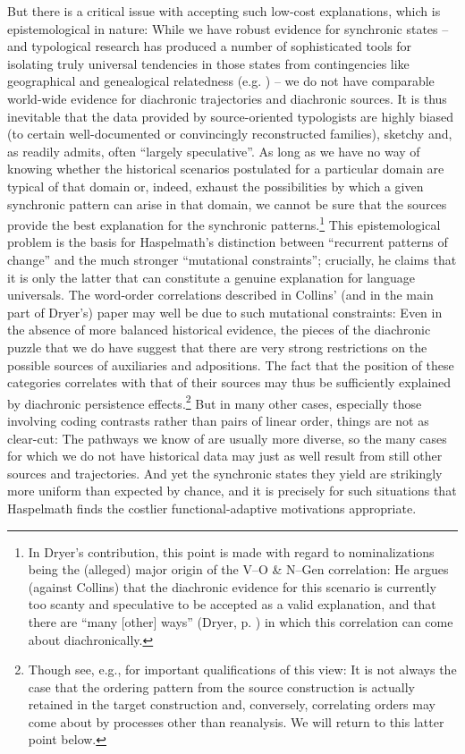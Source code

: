 \documentclass[output=paper]{langsci/langscibook}
\begin{document}
But there is a critical issue with accepting such low-cost explanations, which is epistemological in nature: While we have robust evidence for synchronic states – and typological research has produced a number of sophisticated tools for isolating truly universal tendencies in those states from contingencies like geographical and genealogical relatedness (e.g. \citealt{Bickel2013,Bickel2018,JaegerEtAl2011}) – we do not have comparable world-wide evidence for diachronic trajectories and diachronic sources. It is thus inevitable that the data provided by source-oriented typologists are highly biased (to certain well-documented or convincingly reconstructed families), sketchy and, as \citet[3]{Creissels2008} readily admits, often “largely speculative”. As long as we have no way of knowing whether the historical scenarios postulated for a particular domain are typical of that domain or, indeed, exhaust the possibilities by which a given synchronic pattern can arise in that domain, we cannot be sure that the sources provide the best explanation for the synchronic patterns.\footnote{In Dryer’s contribution, this point is made with regard to nominalizations being the (alleged) major origin of the V–O \& N–Gen correlation: He argues (against Collins) that the diachronic evidence for this scenario is currently too scanty and speculative to be accepted as a valid explanation, and that there are “many [other] ways” (Dryer, p. \pageref{p:dryer:manyotherways}) in which this correlation can come about diachronically.} 
\newpage
This epistemological problem is the basis for Haspelmath’s distinction between “recurrent patterns of change” and the much stronger “mutational constraints”; crucially, he claims that it is only the latter that can constitute a genuine explanation for language universals. The word-order correlations described in Collins’ (and in the main part of Dryer’s) paper may well be due to such mutational constraints: Even in the absence of more balanced historical evidence, the pieces of the diachronic puzzle that we do have suggest that there are very strong restrictions on the possible sources of auxiliaries and adpositions. The fact that the position of these categories correlates with that of their sources may thus be sufficiently explained by diachronic persistence effects.\footnote{Though see, e.g., \citet[210--215]{Harris1995_Hist} for important qualifications of this view: It is not always the case that the ordering pattern from the source construction is actually retained in the target construction and, conversely, correlating orders may come about by processes other than reanalysis. We will return to this latter point below.} But in many other cases, especially those involving coding contrasts rather than pairs of linear order, things are not as clear-cut: The pathways we know of are usually more diverse, so the many cases for which we do not have historical data may just as well result from still other sources and trajectories. And yet the synchronic states they yield are strikingly more uniform than expected by chance, and it is precisely for such situations that Haspelmath finds the costlier functional-adaptive motivations appropriate.
\end{document}
